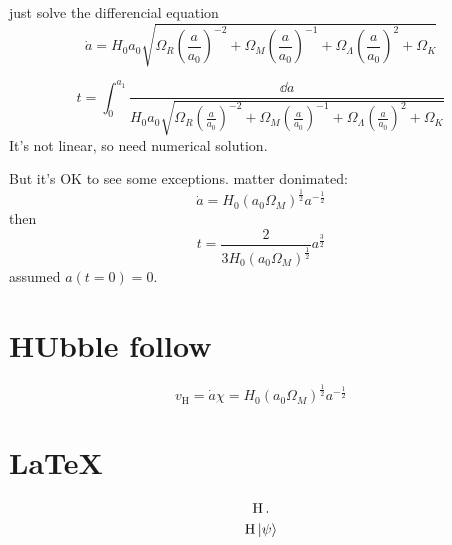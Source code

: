 just solve the differencial equation
\begin{equation}
    \dot{a} = H_0 a_0 \sqrt{\Omega_R \left(\frac{a}{a_0}\right)^{-2} + \Omega_M {\left(\frac{a}{a_0}\right)}^{-1} + \Omega_\Lambda{\left(\frac{a}{a_0}\right)}^{2} + \Omega_K}
\end{equation}

\begin{equation}
    t = \int_{0}^{a_1}  \frac{\dd a}{H_0 a_0 \sqrt{\Omega_R \left(\frac{a}{a_0}\right)^{-2} + \Omega_M \left(\frac{a}{a_0}\right)^{-1} + \Omega_\Lambda\left(\frac{a}{a_0}\right)^{2} + \Omega_K}}
\end{equation}
It's not linear, so need numerical solution. 

But it's OK to see some  exceptions.
    matter donimated:
    \begin{equation}
        \dot{a} = H_0 (a_0 \Omega_M)^{\frac{1}{2}}  a^{-\frac{1}{2}} 
    \end{equation}
    then 
    \begin{equation}
        t = \frac{2}{3 H_0 (a_0 \Omega_M)^{\frac{1}{2}} } a^{\frac{3}{2}} 
    \end{equation}
    assumed $a(t=0)=0$.

\section{HUbble follow}

\begin{equation}
    v_{\mathrm{H}} = \dot{a} \chi 
    = H_0 (a_0 \Omega_M)^{\frac{1}{2}}  a^{-\frac{1}{2}}  
\end{equation}

\section*{\LaTeX}


\begin{gather}
    \operatorname{H}.\\
    \operatorname{H} \ket{\psi}
\end{gather}




